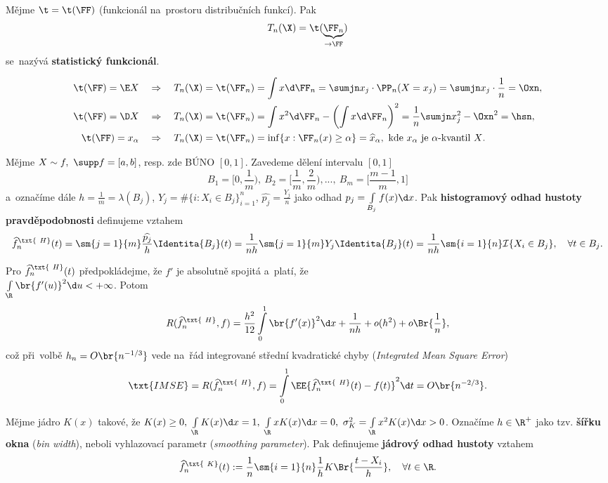 \begin{define}
	Mějme $\t=\t(\FF)$ (funkcionál na~prostoru distribučních funkcí). Pak $$T_n(\X)=\t(\underbrace{\FF_n}_{\to \FF})$$ se~nazývá \textbf{statistický funkcionál}.
\end{define}
\begin{example}
	\[
	\begin{split}
	\t(\FF)=\E X\quad &\Rightarrow\quad T_n(\X)=\t(\FF_n)=\int x\d\FF_n=\sumjn x_j\cdot\PP_n(X=x_j)=\sumjn x_j\cdot \frac{1}{n}=\Oxn, \\
	\t(\FF)=\D X\quad &\Rightarrow\quad  T_n(\X)=\t(\FF_n)=\int x^2\d\FF_n-\left( \int x\d\FF_n \right)^2=\frac{1}{n}\sumjn x_j^2-\Oxn^2=\hsn, \\
	\t(\FF)=x_{\alpha} \quad&\Rightarrow\quad T_n(\X)=\t(\FF_n)=\inf\{ x:\FF_n(x)\geq\alpha \}=\widehat{x}_\alpha,\text{ kde $x_\alpha$ je $\alpha$-kvantil $X$}.
	\end{split}
	\]
\end{example}
\begin{define}[Histogram]
	Mějme $X\sim f,~\supp f=[a,b]$, resp. zde BÚNO $[0,1]$. Zavedeme dělení intervalu $[0,1]$
	$$ B_1=\Big[0,\frac{1}{m}\Big),~B_2=\Big[\frac{1}{m},\frac{2}{m}\Big),...,~B_m=\Big[\frac{m-1}{m},1\Big] $$
	 a~označíme dále $h=\frac{1}{m}=\lambda(B_j)$, $Y_j=\#\{ i: X_i\in B_j \}_{i=1}^n$, $\widehat{p_j}=\frac{Y_j}{n}$ jako odhad $p_j=\int\limits_{B_j}f(x)\d x$. Pak \textbf{histogramový odhad hustoty pravděpodobnosti} definujeme vztahem
	$$ \widehat{f}_n^\txt{~H}(t)=\sm{j=1}{m}\frac{\widehat{p_j}}{h}\Identita{B_j}(t)=\frac{1}{nh}\sm{j=1}{m}Y_j\Identita{B_j}(t)=\frac{1}{nh}\sm{i=1}{n}\mathcal{I}{\{X_i\in B_j\}},\quad\forall t\in B_j. $$
\end{define}
\begin{theorem}[IMSE]
	Pro $\widehat{f}_n^\txt{~H}(t)$ předpokládejme, že $f'$ je absolutně spojitá a~platí, že\\ $\int\limits_{\R}\br{f'(u)}^2\d u<+\infty$. Potom
	$$ R(\widehat{f}_n^\txt{~H},f)=\frac{h^2}{12}\int\limits_{0}^1\br{f'(x)}^2\d x+\frac{1}{nh}+o(h^2)+o\Br{\frac{1}{n}}, $$
	což při~volbě $h_n=O\br{n^{-1/3}}$ vede na~řád integrované střední kvadratické chyby (\textit{Integrated Mean Square Error})
	$$ \txt{IMSE}=R(\widehat{f}_n^\txt{~H},f)=\int\limits_{0}^1\EE{\widehat{f}_n^\txt{~H}(t)-f(t)}^2\d t=O\br{n^{-2/3}}. $$
\end{theorem}
\begin{define}
	Mějme jádro $K(x)$ takové, že $K(x)\geq0,~\int\limits_{\R}K(x)\d x=1,~\int\limits_{\R}xK(x)\d x=0,~\sigma_K^2=\int\limits_{\R}x^2K(x)\d x>0$. Označíme $h\in\R^+$ jako tzv. \textbf{šířku okna} (\textit{bin width}), neboli vyhlazovací parametr (\textit{smoothing parameter}). Pak definujeme \textbf{jádrový odhad hustoty} vztahem
	$$ \widehat{f}_n^\txt{~K}(t):=\frac{1}{n}\sm{i=1}{n}\frac{1}{h}K\Br{\frac{t-X_i}{h}},\quad\forall t\in\R. $$
\end{define}
